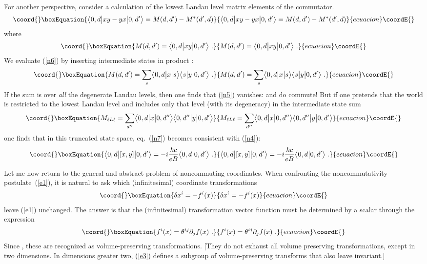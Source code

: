 \documentclass[a4paper,12pt,twoside]{article}
\providecommand{\bra}[1]{\bigl\langle #1 \bigr| }
\providecommand{\ket}[1]{\bigl| #1 \bigr\rangle}
\providecommand{\braket}[2]{\bigl\langle #1 \big|  #2 \bigr\rangle}
\providecommand{\numeq}[2]{\begin{equation}\coord{}\boxEquation{
#2
\label{#1}
}{
#2
}{ecuacion}\coordE{}\end{equation}}
\providecommand{\refeq}[1]{(\ref{#1})}
\begin{document}
For another perspective, consider a calculation of the lowest Landau level  matrix elements of
the \myHighlight{$[x,y]$}\coordHE{} commutator. 
\numeq{n5}{
\bra{0,d} xy - yx \ket{0,d'} = M(d,d') - M^* (d',d)
}
where
\numeq{n6}{
 M(d,d') = \bra{0,d} xy \ket{0,d'} \ .
}
We evaluate \refeq{n6} by inserting intermediate states in product \coordHE{}:
\numeq{n7}{
 M(d,d') = \sum_s \bra{0,d} x  \ket{s} \bra{s}  y \ket{0,d'}\ . 
}
If the sum is over \emph{all} the degenerate Landau levels, then one finds that \refeq{n5}
vanishes: \coordHE{} and \coordHE{} do commute! But if one pretends that the world is restricted to the
lowest Landau level and includes only that level (with its degeneracy) in the intermediate
state sum 
\numeq{n8}{
M_{\ell L\ell} = \sum_{d''} \bra{0,d} x  \ket{0,d''} \bra{0,d''}  y \ket{0,d'}
}
one finds that in this truncated state space, eq.~\refeq{n7} becomes consistent with \refeq{n4}:
\numeq{n9}{
\bra{0,d} [x,y] \ket{0,d'} = -i \frac{\hbar c}{eB} \braket{0,d}{0,d'} \ . 
}

Let me now return to the general and abstract problem of noncommuting coordinates. 
When confronting the noncommutativity postulate~\refeq{e1}, it is natural to ask which
(infinitesimal) coordinate transformations 
\numeq{e2}{
\delta x^i = -f^i (x) 
}
leave \refeq{e1} unchanged. 
The answer is that the (infinitesimal) transformation vector function \coordHE{} must be
determined by a scalar \coordHE{} through the expression~\cite{r3}
\numeq{e3}{
f^i (x) = \theta^{ij} \partial_j f(x) \ . 
}
Since \coordHE{},   these are recognized as volume-preserving transformations.
[They do not exhaust all volume preserving transformations, except in two dimensions. In
dimensions greater  two,
\refeq{e3} defines a subgroup of volume-preserving transforms that also leave \coordHE{}
invariant.]
\end{document}
